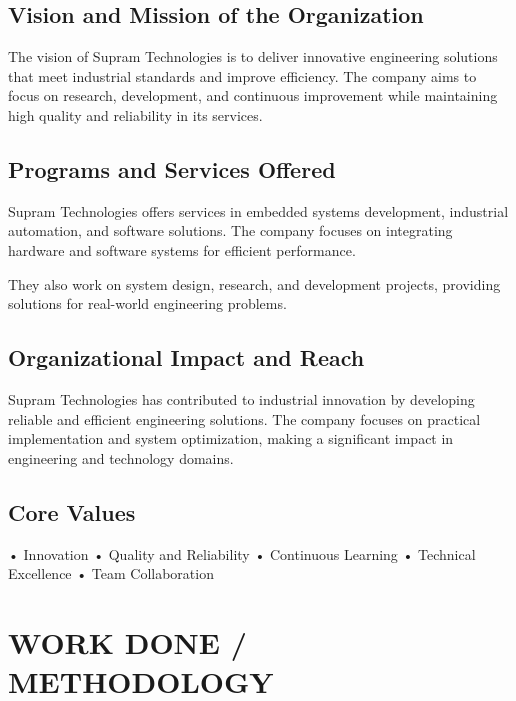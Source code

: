 \documentclass[12pt,a4paper]{report}
\begin{document}
\section{Vision and Mission of the Organization}

The vision of Supram Technologies is to deliver innovative engineering solutions that meet industrial standards and improve efficiency. The company aims to focus on research, development, and continuous improvement while maintaining high quality and reliability in its services.


\section{Programs and Services Offered}

Supram Technologies offers services in embedded systems development, industrial automation, and software solutions. The company focuses on integrating hardware and software systems for efficient performance.


They also work on system design, research, and development projects, providing solutions for real-world engineering problems.


\section{Organizational Impact and Reach}

Supram Technologies has contributed to industrial innovation by developing reliable and efficient engineering solutions. The company focuses on practical implementation and system optimization, making a significant impact in engineering and technology domains.


\section{Core Values}

• Innovation • Quality and Reliability • Continuous Learning • Technical Excellence • Team Collaboration




\chapter{WORK DONE / METHODOLOGY}
\label{ch:work}
\end{document}
